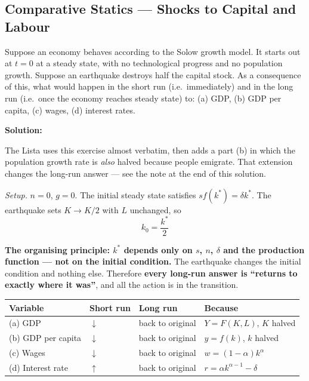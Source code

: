 \documentclass[12pt, letterpaper]{article}
\newcommand{\stst}{^{\ast}}
\begin{document}
\subsection{Comparative Statics --- Shocks to Capital and Labour}

\begin{tcolorbox}[oddbox,title={Problem 4.1 \quad An Earthquake}]
\begin{tcolorbox}[questionbox]
Suppose an economy behaves according to the Solow growth model. It starts out at $t=0$ at a
steady state, with no technological progress and no population growth. Suppose an earthquake
destroys half the capital stock. As a consequence of this, what would happen in the short run
(i.e.\ immediately) and in the long run (i.e.\ once the economy reaches steady state) to:
(a) GDP, (b) GDP per capita, (c) wages, (d) interest rates.
\end{tcolorbox}

\textbf{Solution:}

\begin{tcolorbox}[theorybox,title={This is question 4 of Lista de Exerc\'icios 1 (3 pts)}]
The Lista uses this exercise almost verbatim, then adds a part (b) in which the population
growth rate is \emph{also} halved because people emigrate. That extension changes the
long-run answer --- see the note at the end of this solution.
\end{tcolorbox}

\emph{Setup.} $n = 0$, $g = 0$. The initial steady state satisfies $s f(k\stst) = \delta k\stst$.
The earthquake sets $K \to K/2$ with $L$ unchanged, so
$$k_0 = \frac{k\stst}{2}$$

\textbf{The organising principle: $k\stst$ depends only on $s$, $n$, $\delta$ and the
production function --- not on the initial condition.} The earthquake changes the initial
condition and nothing else. Therefore \textbf{every long-run answer is ``returns to exactly
where it was''}, and all the action is in the transition.

\begin{center}
\begin{tabular}{llll}
\toprule
\textbf{Variable} & \textbf{Short run} & \textbf{Long run} & \textbf{Because} \\
\midrule
(a) GDP          & $\downarrow$ & back to original & $Y = F(K,L)$, $K$ halved \\
(b) GDP per capita & $\downarrow$ & back to original & $y = f(k)$, $k$ halved \\
(c) Wages        & $\downarrow$ & back to original & $w = (1-\alpha)k^\alpha$ \\
(d) Interest rate & $\uparrow$   & back to original & $r = \alpha k^{\alpha-1} - \delta$ \\
\bottomrule
\end{tabular}
\end{center}


\end{tcolorbox}
\end{document}
